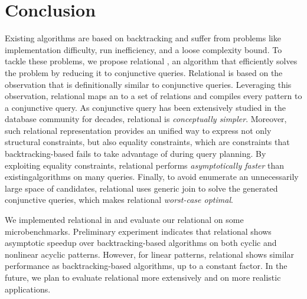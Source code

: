 \chapter{Conclusion}

Existing \ematching algorithms are based on backtracking and suffer from problems like implementation difficulty, run inefficiency, and a loose complexity bound. To tackle these problems, we propose relational \ematching, an algorithm that efficiently solves the \ematching problem by reducing it to conjunctive queries. Relational \ematching is based on the observation that \ematching is definitionally similar to conjunctive queries. Leveraging this observation, relational \ematching maps an \egraph to a set of relations and compiles every \ematching pattern to a conjunctive query. As conjunctive query has been extensively studied in the database community for decades, relational \ematching is \textit{conceptually simpler}. Moreover, such relational representation provides an unified way to express not only structural constraints, but also equality constraints, which are constraints that backtracking-based \ematching fails to take advantage of during query planning. By exploiting equality constraints, relational \ematching performs \textit{asymptotically faster }than existing\ematching algorithms on many queries. Finally, to avoid enumerate an unnecessarily large space of candidates, relational \ematching uses generic join to solve the generated conjunctive queries, which makes relational \ematching \textit{worst-case optimal}.

We implemented relational \ematching in \egg and evaluate our relational \ematching on some microbenchmarks. Preliminary experiment indicates that relational \ematching shows asymptotic speedup over backtracking-based \ematching algorithms on both cyclic and nonlinear acyclic patterns. However, for linear patterns, relational \ematching shows similar performance as backtracking-based \ematching algorithms, up to a constant factor. In the future, we plan to evaluate relational \ematching more extensively and on more realistic \egraph applications.